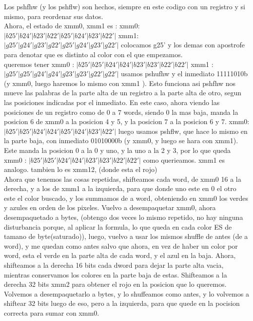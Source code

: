 \documentclass[a4paper]{article}
\begin{document}
\hfill \break
Los pshfhw (y los pshflw) son hechos, siempre en este codigo con un registro y si mismo, para reordenar sus datos.
\hfill \break
\\
Ahora, el estado de xmm0, xmm1 es :
\hfill \break
xmm0: $|b25'|b24'|b23'|b22'|b25'|b24'|b23'|b22'|$
\hfill \break
xmm1: $|g25'|g24'|g23'|g22'|g25'|g24'|g23'|g22'|$\hfill \break
 colocamos g25' y los demas con apostrofe  para denotar que es distinto al color con el que empezamos.
\hfill \break
\\
queremos tener 
\hfill \break
 xmm0 : $|b25'|b25'|b24'|b24'|b23'|b23'|b22'|b22'|$
 \hfill \break
 xmm1 : $|g25'|g25'|g24'|g24'|g23'|g23'|g22'|g22'|$
 \hfill \break
usamos pshufhw y el inmediato 11111010b (y xmm0, luego haremos lo mismo con xmm1  ). Esto funciona asi pshfhw nos mueve las palabras de la parte alta de un registro a la parte alta de otro, segun las posiciones indicadas por el inmediato. En este caso, ahora viendo las posiciones de un registro como de 0 a 7 words, siendo 0 la mas baja,  manda la posicion 6 de xmm0 a la posicion 4 y 5, 
y la posicion 7 a la posicion 6 y 7. 
\hfill \break
xmm0:$|b25'|b25'|b24'|b24'|b25'|b24'|b23'|b22'|$
\hfill \break
luego usamos pshflw, que hace lo mismo en la parte baja, con inmediato 01010000b (y xmm0, y luego se hara con xmm1). Este manda la posicion 0 a la 0 y uno, y la uno a la 2 y 3, por lo que queda 
\hfill \break
 xmm0 : $|b25'|b25'|b24'|b24'|b23'|b23'|b22'|b22'|$\hfill \break
 como querieamos. xmm1 es analogo. tambien lo es xmm12, (donde esta el rojo)
 \hfill \break \\
 Ahora que tenemos las cosas repetidas, shifteamos cada word, de xmm0 16 a la derecha, y a los de xmm1 a la izquierda, para que donde uno este en 0 el otro este el color buscado, y los summamos de a word, obteniendo en xmm0 los verdes y azules en orden de los pixeles.
 \hfill \break
 Vuelvo a desempaquetar xmm0, ahora desempaquetado a bytes, (obtengo dos veces lo mismo repetido, no hay ninguna disturbancia porque, al aplicar la formula, lo que queda en cada color ES de tamano de  byte(saturado)), luego, vuelvo a usar los mismos shuffle de antes (de a word), y me quedan como antes salvo que ahora, en vez de haber un color por word, esta el verde en la parte alta de cada word, y el azul en la baja. 
 \hfill \break
 Ahora, shifteamos a la derecha 16 bits cada dword para dejar la parte alta vacia, mientras conservamos los colores en la parte baja de estas. Shifteamos a la derecha 32 bits xmm2 para obtener el rojo en la posicion que lo queremos. Volvemos a desempaquetarlo a  bytes, y lo shuffeamos como antes, y lo volvemos a shiftear 32 bits luego de eso, pero a la izquierda, para que quede en la pocision correcta para sumar con xmm0.
\end{document}
